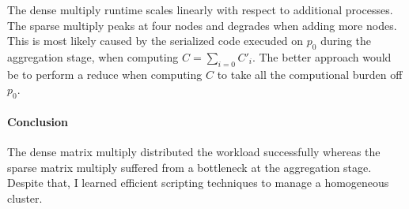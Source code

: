 \documentclass{article}
\begin{document}
The dense multiply runtime scales linearly with respect to additional processes. The sparse multiply peaks at four nodes and degrades when adding more nodes. This is most likely caused by the serialized code execuded on $p_0$ during the aggregation stage, when computing $C = \sum_{i=0} C'_i$. The better approach would be to perform a reduce when computing $C$ to take all the computional burden off $p_0$.

\paragraph{Conclusion}
The dense matrix multiply distributed the workload successfully whereas the sparse matrix multiply suffered from a bottleneck at the aggregation stage. Despite that, I learned efficient scripting techniques to manage a homogeneous cluster.
\end{document}
